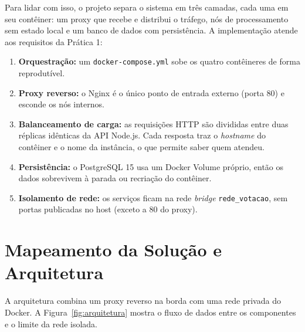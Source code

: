 \documentclass[12pt,a4paper]{article}
\begin{document}
Para lidar com isso, o projeto separa o sistema em três camadas, cada uma em seu contêiner: um proxy que recebe e distribui o tráfego, nós de processamento sem estado local e um banco de dados com persistência. A implementação atende aos requisitos da Prática 1:
\begin{enumerate}
    \item \textbf{Orquestração:} um \texttt{docker-compose.yml} sobe os quatro contêineres de forma reprodutível.
    \item \textbf{Proxy reverso:} o Nginx é o único ponto de entrada externo (porta 80) e esconde os nós internos.
    \item \textbf{Balanceamento de carga:} as requisições HTTP são divididas entre duas réplicas idênticas da API Node.js. Cada resposta traz o \textit{hostname} do contêiner e o nome da instância, o que permite saber quem atendeu.
    \item \textbf{Persistência:} o PostgreSQL 15 usa um Docker Volume próprio, então os dados sobrevivem à parada ou recriação do contêiner.
    \item \textbf{Isolamento de rede:} os serviços ficam na rede \textit{bridge} \texttt{rede\_votacao}, sem portas publicadas no host (exceto a 80 do proxy).
\end{enumerate}

\section{Mapeamento da Solução e Arquitetura}
A arquitetura combina um proxy reverso na borda com uma rede privada do Docker. A Figura~\ref{fig:arquitetura} mostra o fluxo de dados entre os componentes e o limite da rede isolada.
\end{document}
